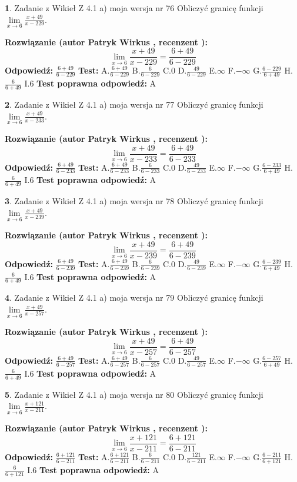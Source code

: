 \documentclass[12pt, a4paper]{article}
\theoremstyle{definition} %
\newtheorem{zad}{}
\newcommand{\zadStart}[1]{\begin{zad}#1\newline}
\newcommand{\zadStop}{\end{zad}}
\newcommand{\rozwStart}[2]{\noindent \textbf{Rozwiązanie (autor #1 , recenzent #2): }\newline}
\newcommand{\rozwStop}{\newline}
\newcommand{\odpStart}{\noindent \textbf{Odpowiedź:}\newline}
\newcommand{\odpStop}{\newline}
\newcommand{\testStart}{\noindent \textbf{Test:}\newline}
\newcommand{\testStop}{\newline}
\newcommand{\kluczStart}{\noindent \textbf{Test poprawna odpowiedź:}\newline}
\newcommand{\kluczStop}{\newline}
\begin{document}
\zadStart{Zadanie z Wikieł Z 4.1 a) moja wersja nr 76}
Obliczyć granicę funkcji $\lim\limits_{x\to6}\frac{x+49}{x-229}$.
\zadStop
\rozwStart{Patryk Wirkus}{}
$$\lim\limits_{x\to6}\frac{x+49}{x-229} = \frac{6+49}{6-229}$$
\rozwStop
\odpStart
$\frac{6+49}{6-229}$
\odpStop
\testStart
A.$\frac{6+49}{6-229}$
B.$\frac{6}{6-229}$
C.$0$
D.$\frac{49}{6-229}$
E.$\infty$
F.$-\infty$
G.$\frac{6-229}{6+49}$
H.$\frac{6}{6+49}$
I.$6$
\testStop
\kluczStart
A
\kluczStop



\zadStart{Zadanie z Wikieł Z 4.1 a) moja wersja nr 77}
Obliczyć granicę funkcji $\lim\limits_{x\to6}\frac{x+49}{x-233}$.
\zadStop
\rozwStart{Patryk Wirkus}{}
$$\lim\limits_{x\to6}\frac{x+49}{x-233} = \frac{6+49}{6-233}$$
\rozwStop
\odpStart
$\frac{6+49}{6-233}$
\odpStop
\testStart
A.$\frac{6+49}{6-233}$
B.$\frac{6}{6-233}$
C.$0$
D.$\frac{49}{6-233}$
E.$\infty$
F.$-\infty$
G.$\frac{6-233}{6+49}$
H.$\frac{6}{6+49}$
I.$6$
\testStop
\kluczStart
A
\kluczStop



\zadStart{Zadanie z Wikieł Z 4.1 a) moja wersja nr 78}
Obliczyć granicę funkcji $\lim\limits_{x\to6}\frac{x+49}{x-239}$.
\zadStop
\rozwStart{Patryk Wirkus}{}
$$\lim\limits_{x\to6}\frac{x+49}{x-239} = \frac{6+49}{6-239}$$
\rozwStop
\odpStart
$\frac{6+49}{6-239}$
\odpStop
\testStart
A.$\frac{6+49}{6-239}$
B.$\frac{6}{6-239}$
C.$0$
D.$\frac{49}{6-239}$
E.$\infty$
F.$-\infty$
G.$\frac{6-239}{6+49}$
H.$\frac{6}{6+49}$
I.$6$
\testStop
\kluczStart
A
\kluczStop



\zadStart{Zadanie z Wikieł Z 4.1 a) moja wersja nr 79}
Obliczyć granicę funkcji $\lim\limits_{x\to6}\frac{x+49}{x-257}$.
\zadStop
\rozwStart{Patryk Wirkus}{}
$$\lim\limits_{x\to6}\frac{x+49}{x-257} = \frac{6+49}{6-257}$$
\rozwStop
\odpStart
$\frac{6+49}{6-257}$
\odpStop
\testStart
A.$\frac{6+49}{6-257}$
B.$\frac{6}{6-257}$
C.$0$
D.$\frac{49}{6-257}$
E.$\infty$
F.$-\infty$
G.$\frac{6-257}{6+49}$
H.$\frac{6}{6+49}$
I.$6$
\testStop
\kluczStart
A
\kluczStop



\zadStart{Zadanie z Wikieł Z 4.1 a) moja wersja nr 80}
Obliczyć granicę funkcji $\lim\limits_{x\to6}\frac{x+121}{x-211}$.
\zadStop
\rozwStart{Patryk Wirkus}{}
$$\lim\limits_{x\to6}\frac{x+121}{x-211} = \frac{6+121}{6-211}$$
\rozwStop
\odpStart
$\frac{6+121}{6-211}$
\odpStop
\testStart
A.$\frac{6+121}{6-211}$
B.$\frac{6}{6-211}$
C.$0$
D.$\frac{121}{6-211}$
E.$\infty$
F.$-\infty$
G.$\frac{6-211}{6+121}$
H.$\frac{6}{6+121}$
I.$6$
\testStop
\kluczStart
A
\kluczStop
\end{document}
